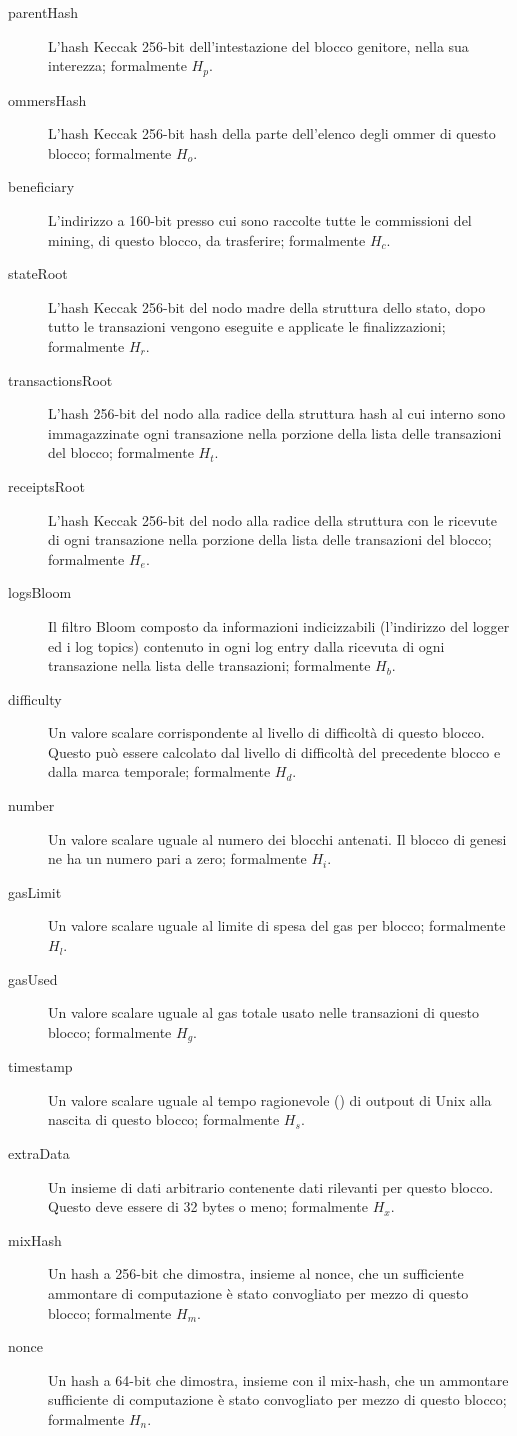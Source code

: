 \documentclass[9pt,oneside]{amsart}
\begin{document}
\begin{multicols}{2}
\begin{description}
\item[parentHash] L'hash Keccak 256-bit dell'intestazione del blocco genitore, nella sua interezza; formalmente $H_p$.
\item[ommersHash] L'hash Keccak 256-bit hash della parte dell'elenco degli ommer di questo blocco; formalmente $H_o$.
\item[beneficiary] L'indirizzo a 160-bit presso cui sono raccolte tutte le commissioni del mining, di questo blocco, da trasferire; formalmente $H_c$.
\item[stateRoot] L'hash Keccak 256-bit del nodo madre della struttura dello stato, dopo tutto le transazioni vengono eseguite e applicate le finalizzazioni; formalmente $H_r$.
\item[transactionsRoot] L'hash 256-bit del nodo alla radice della struttura hash al cui interno sono immagazzinate ogni transazione nella porzione della lista delle transazioni del blocco; formalmente $H_t$.
\item[receiptsRoot] L'hash Keccak 256-bit del nodo alla radice della struttura con le ricevute di ogni transazione nella porzione della lista delle transazioni del blocco; formalmente $H_e$.
\item[logsBloom] Il filtro Bloom composto da informazioni indicizzabili (l'indirizzo del logger ed i log topics) contenuto in ogni log entry dalla ricevuta di ogni transazione nella lista delle transazioni; formalmente $H_b$.
\item[difficulty] Un valore scalare corrispondente al livello di difficoltà di questo blocco. Questo può essere calcolato dal livello di difficoltà del precedente blocco e dalla marca temporale; formalmente $H_d$.
\item[number] Un valore scalare uguale al numero dei blocchi antenati. Il blocco di genesi ne ha un numero pari a zero; formalmente $H_i$.
\item[gasLimit] Un valore scalare uguale al limite di spesa del gas per blocco; formalmente $H_l$.
\item[gasUsed] Un valore scalare uguale al gas totale usato nelle transazioni di questo blocco; formalmente $H_g$.
\item[timestamp] Un valore scalare uguale al tempo ragionevole () di outpout di Unix alla nascita di questo blocco; formalmente $H_s$.
\item[extraData] Un insieme di dati arbitrario contenente dati rilevanti per questo blocco. Questo deve essere di 32 bytes o meno; formalmente $H_x$.
\item[mixHash] Un hash a 256-bit che dimostra, insieme al nonce, che un sufficiente ammontare di computazione è stato convogliato per mezzo di questo blocco; formalmente $H_m$.
\item[nonce] Un hash a 64-bit che dimostra, insieme con il mix-hash, che un ammontare sufficiente di computazione è stato convogliato per mezzo di questo blocco; formalmente $H_n$.
\end{description}


\end{multicols}
\end{document}
